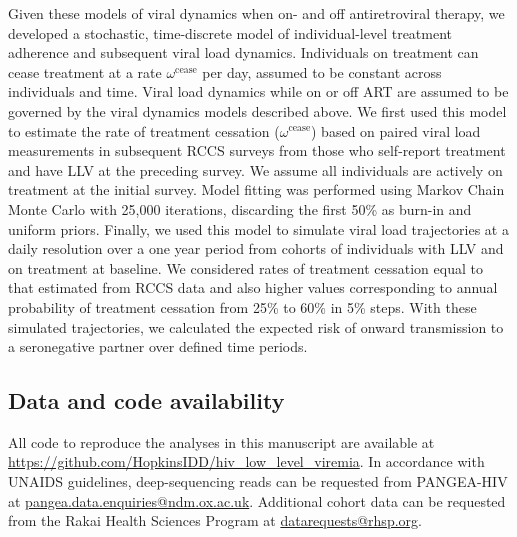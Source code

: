 \documentclass{article}[11pt]
\begin{document}
Given these models of viral dynamics when on- and off antiretroviral therapy, we developed a stochastic, time-discrete model of individual-level treatment adherence and subsequent viral load dynamics. Individuals on treatment can cease treatment at a rate $\omega^{\text{cease}}$ per day, assumed to be constant across individuals and time. Viral load dynamics while on or off ART are assumed to be governed by the viral dynamics models described above. We first used this model to estimate the rate of treatment cessation ($\omega^{\text{cease}}$) based on paired viral load measurements in subsequent RCCS surveys from those who self-report treatment and have LLV at the preceding survey. We assume all individuals are actively on treatment at the initial survey. Model fitting was performed using Markov Chain Monte Carlo with 25,000 iterations, discarding the first 50\% as burn-in and uniform priors.  Finally, we used this model to simulate viral load trajectories at a daily resolution over a one year period from cohorts of individuals with LLV and on treatment at baseline. We considered rates of treatment cessation equal to that estimated from RCCS data and also higher  values corresponding to annual probability of treatment cessation from 25\% to 60\% in 5\% steps. With these simulated trajectories, we calculated the expected risk of onward transmission to a seronegative partner over defined time periods.

\subsection*{Data and code availability}
All code to reproduce the analyses in this manuscript are available at \newline \href{https://github.com/HopkinsIDD/hiv_low_level_viremia}{https://github.com/HopkinsIDD/hiv\_low\_level\_viremia}. In accordance with UNAIDS guidelines, deep-sequencing reads can be requested from PANGEA-HIV at \href{mailto:pangea.data.enquiries@ndm.ox.ac.uk}{pangea.data.enquiries@ndm.ox.ac.uk}. Additional cohort data can be requested from the Rakai Health Sciences Program at \href{mailto:datarequests@rhsp.org}{datarequests@rhsp.org}. 

\newpage




\newpage

\renewcommand{\theequation}{\textbf{S\arabic{equation}}}
\setcounter{equation}{0}
\end{document}
